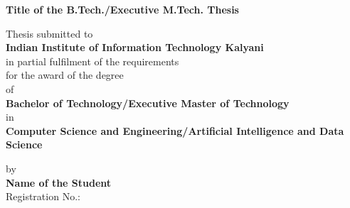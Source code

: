 \thispagestyle{empty}
\pagestyle{empty}
\vspace*{-1.75cm}
\begin{center}
\begin{Large}
{\textbf{Title of the B.Tech./Executive M.Tech. Thesis}}\\
\end{Large}
\end{center}
\vspace{0.2cm}
\begin{center}
 \begin{large}
 Thesis  submitted to \\
 \vspace{.2cm}
 \large{\textbf{Indian Institute of Information Technology Kalyani}}\\
 \vspace{.1cm}
 in partial fulfilment of the requirements\\
 \vspace{0.1cm}
 for the award of the degree\\
 \vspace{0.3cm}
 of\\
 \vspace{0.3cm}
 \textbf{Bachelor of Technology/Executive Master of Technology}
 \vspace{0.3cm}
 \\in\\
 \vspace{0.3cm}
 \textbf{Computer Science and Engineering/Artificial Intelligence and Data Science}
 \end{large}
\end{center}

\vspace{0.00cm}
 \begin{center}
 \begin{large}
 by\\
 \vspace{0.2cm}
 \textbf{Name of the Student}\\
 \vspace{0.1cm}
 Registration No.: \\
 \end{large}
\end{center}

\vspace{0.1cm}

